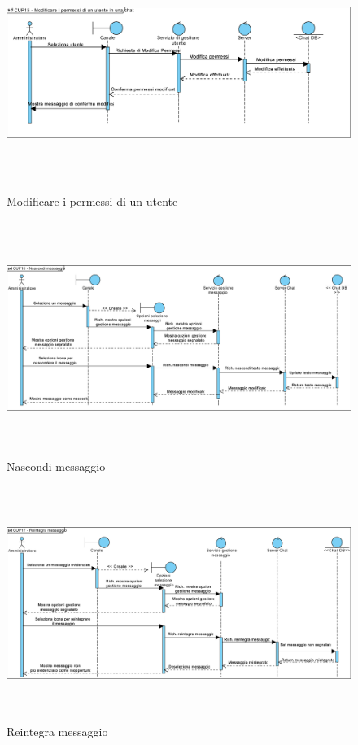 \begin{figure}
	\centering
	\includegraphics[height=3in,width=5in]{imgs/gruppo6/sequence/CUP15_modificare_i_permessi_di_un_utente.pdf}
	\caption{Modificare i permessi di un utente}
	\label{fig:prova}
\end{figure}

\begin{figure}
	\centering
	\includegraphics[height=3in,width=5in]{imgs/gruppo6/sequence/CUP16_nascondi_messaggio.pdf}
	\caption{Nascondi messaggio}
	\label{fig:prova}
\end{figure}

\begin{figure}
	\centering
	\includegraphics[height=3in,width=5in]{imgs/gruppo6/sequence/seq_cup17_reintegra_messaggio.pdf}
	\caption{Reintegra messaggio}
	\label{fig:seq-cup17}
\end{figure}

